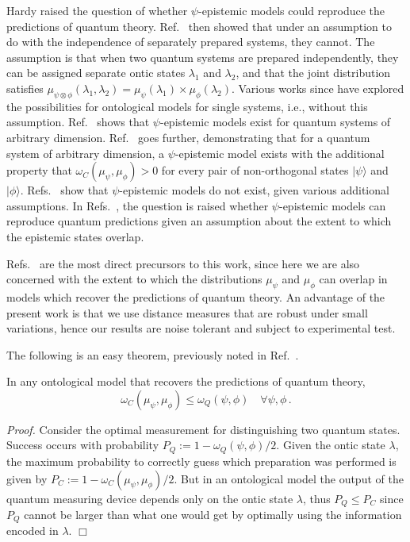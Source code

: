 Hardy \cite{hardyprivcomm} raised the question of whether $\psi$-epistemic models could reproduce the predictions of quantum theory. Ref.~\cite{Pusey2012} then showed that under an assumption to do with the independence of separately prepared systems, they cannot. The assumption is that when two quantum systems are prepared independently, they can be assigned separate ontic states $\lambda_1$ and $\lambda_2$, and that the joint distribution satisfies $\mu_{\psi\otimes\phi}(\lambda_1,\lambda_2) = \mu_{\psi}(\lambda_1)\times \mu_{\phi}(\lambda_2)$. Various works since have explored the possibilities for ontological models for single systems, i.e., without this assumption. Ref.~\cite{Lewis2012} shows that $\psi$-epistemic models exist for quantum systems of arbitrary dimension. Ref.~\cite{Aaronson2013} goes further, demonstrating that for a quantum system of arbitrary dimension, a $\psi$-epistemic model exists with the additional property that $\omega_C(\mu_\psi,\mu_\phi) > 0$ for every pair of non-orthogonal states $|\psi\rangle$ and $|\phi\rangle$. Refs.~\cite{Aaronson2013, Hardy2012, Patra2013} show that $\psi$-epistemic models do not exist, given various additional assumptions. In Refs.~\cite{Maroney2012a,Leifer2013}, the question is raised whether $\psi$-epistemic models can reproduce quantum predictions given an assumption about the extent to which the epistemic states overlap.

Refs.~\cite{Maroney2012a,Leifer2013} are the most direct precursors to this work, since here we are also concerned with the extent to which the distributions $\mu_\psi$ and $\mu_\phi$ can overlap in models which recover the predictions of quantum theory. An advantage of the present work is that we use distance measures that are robust under small variations, hence our results are noise tolerant and subject to experimental test.

The following is an easy theorem, previously noted in Ref.~\cite{pbriontrap}.
\begin{thm} \label{thm:delta_ineq}
In any ontological model that recovers the predictions of quantum theory, 
\begin{equation} \label{eq:delta_ineq}
\omega_C(\mu_\psi,\mu_\phi) \leq \omega_Q(\psi, \phi)  \quad \forall \psi,\phi \, .
\end{equation}
\end{thm}
\textit{Proof.} Consider the optimal measurement for distinguishing two quantum states. Success occurs with probability $P_Q:=1-\omega_Q(\psi,\phi)/2$. Given the ontic state $\lambda$, the maximum probability to correctly guess which preparation was performed is given by $P_C:=1-\omega_C(\mu_\psi,\mu_\phi)/2$. But in an ontological model the output of the quantum measuring device depends only on the ontic state $\lambda$, thus $P_Q\leq P_C$ since $P_Q$ cannot be larger than what one would get by optimally using the information encoded in $\lambda$. $\Box$

